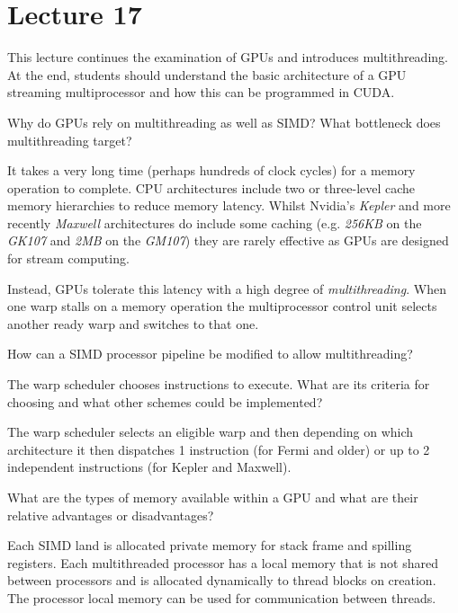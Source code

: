 \documentclass{supervision}
\begin{document}
\section*{Lecture 17}

This lecture continues the examination of GPUs and introduces multithreading. At the end, students should understand the basic architecture of a GPU streaming multiprocessor and how this can be programmed in CUDA.

\begin{questions}
    \question
    Why do GPUs rely on multithreading as well as SIMD? What bottleneck does multithreading target?
    \begin{solution}
    It takes a very long time (perhaps hundreds of clock cycles) for a memory operation to complete. CPU architectures include two or three-level cache memory hierarchies to reduce memory latency. Whilst Nvidia's \textit{Kepler} and more recently \textit{Maxwell} architectures do include some caching (e.g. \textit{256KB} on the \textit{GK107} and \textit{2MB} on the \textit{GM107}) they are rarely effective as GPUs are designed for stream computing.
    
    Instead, GPUs tolerate this latency with a high degree of \textit{multithreading}. When one warp stalls on a memory operation the multiprocessor control unit selects another ready warp and switches to that one.
    \end{solution}

    \question
    How can a SIMD processor pipeline be modified to allow multithreading?
    \begin{solution}
    \end{solution}

    \question
    The warp scheduler chooses instructions to execute. What are its criteria for choosing and what other schemes could be implemented?
    \begin{solution}
    The warp scheduler selects an eligible warp and then depending on which architecture it then dispatches 1 instruction (for Fermi and older) or up to 2 independent instructions (for Kepler and Maxwell).
    \end{solution}

    \question
    What are the types of memory available within a GPU and what are their relative advantages or disadvantages?
    \begin{solution}
    Each SIMD land is allocated private memory for stack frame and spilling registers. Each multithreaded processor has a local memory that is not shared between processors and is allocated dynamically to thread blocks on creation. The processor local memory can be used for communication between threads.
    

\end{solution}
\end{questions}
\end{document}
